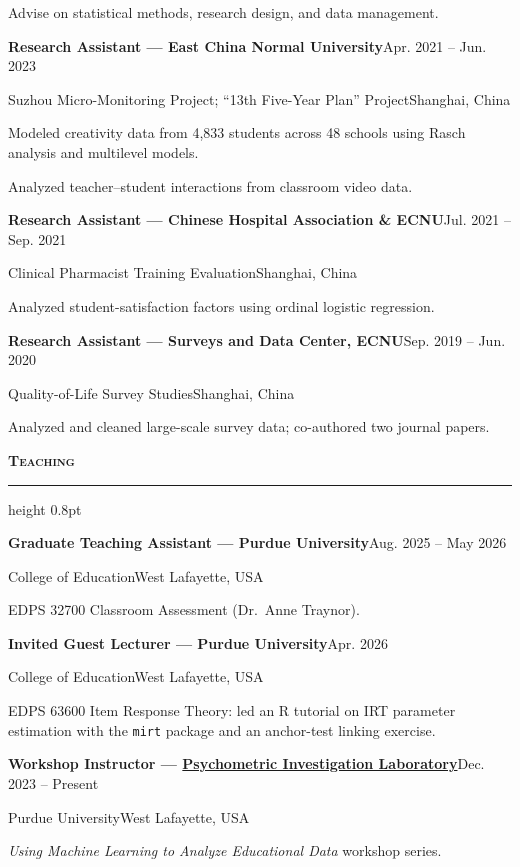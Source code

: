 \documentclass[10.5pt,letterpaper]{article}
\renewcommand{\section}[1]{%
  \needspace{3\baselineskip}\vspace{12pt}\par
  {\fontsize{13.5}{16}\selectfont\bfseries\scshape\color{accent}#1}\hspace{6pt}%
  {\color{accent}\leaders\hrule height 0.8pt\hfill\kern0pt}\par\vspace{6pt}}
\newcommand{\entry}[4]{%
  \needspace{2\baselineskip}%
  {\color{textdark}\textbf{#1}}\hfill{#2}\par
  {#3}\hfill{#4}\par\vspace{3pt}}
\begin{document}
\begin{cvbullets}
  \item Advise on statistical methods, research design, and data management.
\end{cvbullets}
\entry{Research Assistant --- East China Normal University}{Apr. 2021 -- Jun. 2023}{Suzhou Micro-Monitoring Project; ``13th Five-Year Plan'' Project}{Shanghai, China}
\begin{cvbullets}
  \item Modeled creativity data from 4,833 students across 48 schools using Rasch analysis and multilevel models.
  \item Analyzed teacher--student interactions from classroom video data.
\end{cvbullets}
\entry{Research Assistant --- Chinese Hospital Association \& ECNU}{Jul. 2021 -- Sep. 2021}{Clinical Pharmacist Training Evaluation}{Shanghai, China}
\begin{cvbullets}
  \item Analyzed student-satisfaction factors using ordinal logistic regression.
\end{cvbullets}
\entry{Research Assistant --- Surveys and Data Center, ECNU}{Sep. 2019 -- Jun. 2020}{Quality-of-Life Survey Studies}{Shanghai, China}
\begin{cvbullets}
  \item Analyzed and cleaned large-scale survey data; co-authored two journal papers.
\end{cvbullets}

\section{Teaching}
\entry{Graduate Teaching Assistant --- Purdue University}{Aug. 2025 -- May 2026}{College of Education}{West Lafayette, USA}
\begin{cvbullets}
  \item EDPS 32700 Classroom Assessment (Dr.\ Anne Traynor).
\end{cvbullets}
\entry{Invited Guest Lecturer --- Purdue University}{Apr. 2026}{College of Education}{West Lafayette, USA}
\begin{cvbullets}
  \item EDPS 63600 Item Response Theory: led an R tutorial on IRT parameter estimation with the \texttt{mirt} package and an anchor-test linking exercise.
\end{cvbullets}
\entry{Workshop Instructor --- \href{https://education.purdue.edu/research/centers-and-institutes/psychometric-investigation-lab/}{Psychometric Investigation Laboratory}}{Dec. 2023 -- Present}{Purdue University}{West Lafayette, USA}
\begin{cvbullets}
  \item \textit{Using Machine Learning to Analyze Educational Data} workshop series.
\end{cvbullets}
\end{document}

